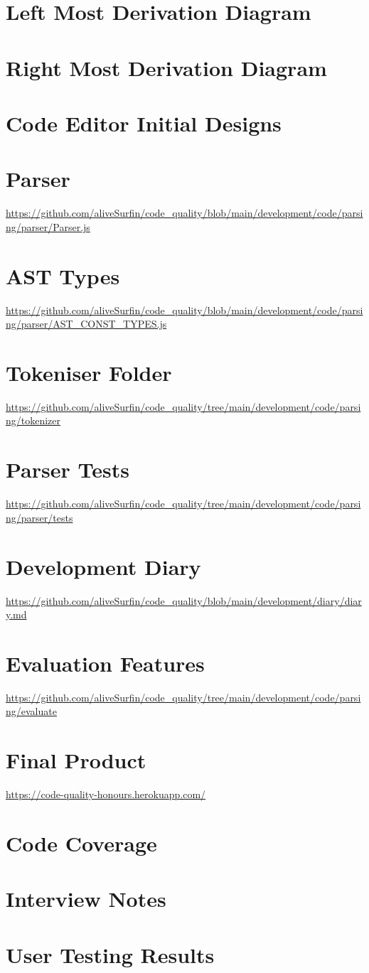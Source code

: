 \section{Left Most Derivation Diagram}
\section{Right Most Derivation Diagram}
\section{Code Editor Initial Designs}
\section{Parser}
\url{https://github.com/aliveSurfin/code_quality/blob/main/development/code/parsing/parser/Parser.js}
\section{AST Types}
\url{https://github.com/aliveSurfin/code_quality/blob/main/development/code/parsing/parser/AST_CONST_TYPES.js}
\section{Tokeniser Folder}
\url{https://github.com/aliveSurfin/code_quality/tree/main/development/code/parsing/tokenizer}
\section{Parser Tests}
\url{https://github.com/aliveSurfin/code_quality/tree/main/development/code/parsing/parser/tests}
\section{Development Diary}
\url{https://github.com/aliveSurfin/code_quality/blob/main/development/diary/diary.md}
\section{Evaluation Features}
\url{https://github.com/aliveSurfin/code_quality/tree/main/development/code/parsing/evaluate}
\section{Final Product}
\url{https://code-quality-honours.herokuapp.com/}
\section{Code Coverage}
\section{Interview Notes}
\section{User Testing Results}
